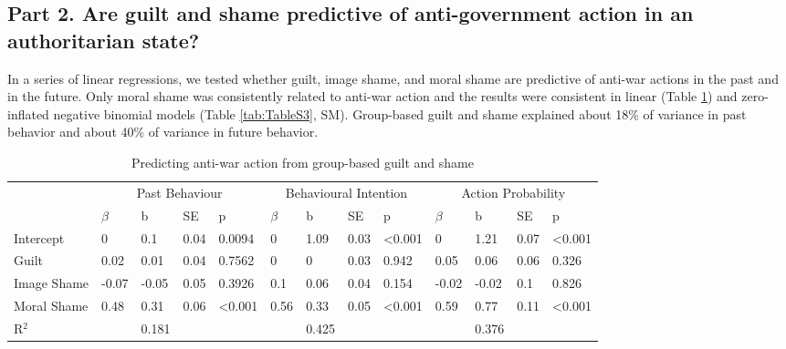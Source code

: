 \documentclass[
]{article}
\begin{document}
\hypertarget{part-2.-are-guilt-and-shame-predictive-of-anti-government-action-in-an-authoritarian-state}{%
\subsection*{Part 2. Are guilt and shame predictive of anti-government action in an authoritarian state?}\label{part-2.-are-guilt-and-shame-predictive-of-anti-government-action-in-an-authoritarian-state}}

In a series of linear regressions, we tested whether guilt, image shame, and moral shame are predictive of anti-war actions in the past and in the future. Only moral shame was consistently related to anti-war action and the results were consistent in linear (Table \ref{tab:Table2}) and zero-inflated negative binomial models (Table \ref{tab:TableS3}, SM). Group-based guilt and shame explained about 18\% of variance in past behavior and about 40\% of variance in future behavior.

\begin{table}[H]

\caption{\label{tab:Table2}Predicting anti-war action from group-based guilt and shame}
\centering
\fontsize{8}{10}\selectfont
\begin{tabular}[t]{lllllllllllll}
\toprule
\multicolumn{1}{c}{} & \multicolumn{4}{c}{Past Behaviour} & \multicolumn{4}{c}{Behavioural Intention} & \multicolumn{4}{c}{Action Probability} \\
\cmidrule(l{3pt}r{3pt}){2-5} \cmidrule(l{3pt}r{3pt}){6-9} \cmidrule(l{3pt}r{3pt}){10-13}
  & $\beta$ & b & SE & p & $\beta$ & b & SE & p & $\beta$ & b & SE & p\\
\midrule
Intercept & 0 & 0.1 & 0.04 & 0.0094 & 0 & 1.09 & 0.03 & <0.001 & 0 & 1.21 & 0.07 & <0.001\\
Guilt & 0.02 & 0.01 & 0.04 & 0.7562 & 0 & 0 & 0.03 & 0.942 & 0.05 & 0.06 & 0.06 & 0.326\\
Image Shame & -0.07 & -0.05 & 0.05 & 0.3926 & 0.1 & 0.06 & 0.04 & 0.154 & -0.02 & -0.02 & 0.1 & 0.826\\
Moral Shame & 0.48 & 0.31 & 0.06 & <0.001 & 0.56 & 0.33 & 0.05 & <0.001 & 0.59 & 0.77 & 0.11 & <0.001\\
\midrule
R$^{2}$ &  & 0.181 &  &  &  & 0.425 &  &  &  & 0.376 &  & \\
\bottomrule
\end{tabular}
\end{table}
\end{document}
